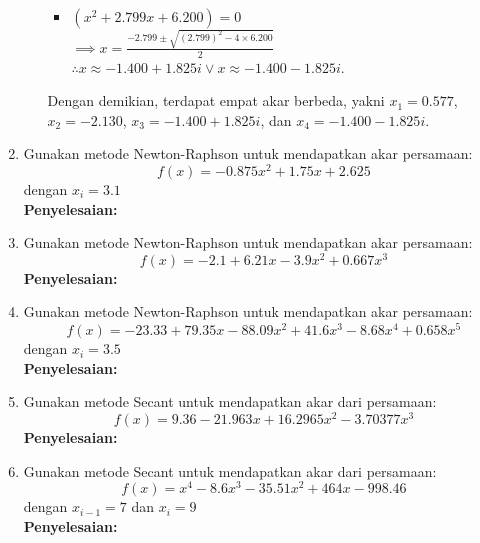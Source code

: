 \documentclass{article}
\newcommand{\penyelesaian}{\textbf{Penyelesaian: }}
\begin{document}
\begin{enumerate}
\begin{enumerate}
\begin{itemize}
            \item $(x^2 + \num{2,799}x + \num{6,200}) = 0$ \\
            $ \implies x = \frac{-\num{2,799} \pm \sqrt{(\num{2,799})^2 - 4 \times \num{6,200}}}{2}$ \\
            $ \therefore x \approx \num{-1,400} + \num{1,825}i \vee x \approx \num{-1,400} - \num{1,825}i$.
        \end{itemize} 
        
        Dengan demikian, terdapat empat akar berbeda, yakni $x_1 = \num{0,577}$, $x_2 = \num{-2,130}$, $x_3 = \num{-1,400} + \num{1,825}i$, dan $x_4 = \num{-1,400} - \num{1,825}i$.
    \end{enumerate}

    \item Gunakan metode Newton-Raphson untuk mendapatkan akar persamaan: \\
    \begin{equation*}
        f(x) = -\num{0,875}x^2 + \num{1,75}x + \num{2,625}
    \end{equation*}
    dengan $x_i = \num{3,1}$ \\
    \penyelesaian

    \item Gunakan metode Newton-Raphson untuk mendapatkan akar persamaan: \\
    \begin{equation*}
        f(x) = -\num{2,1} + \num{6,21}x - \num{3,9}x^2 + \num{0,667}x^3
    \end{equation*}
    \penyelesaian

    \item Gunakan metode Newton-Raphson untuk mendapatkan akar persamaan: \\
    \begin{equation*}
        f(x) = -\num{23,33} + \num{79,35}x - \num{88,09}x^2 + \num{41,6}x^3 - \num{8,68}x^4 + \num{0,658}x^5
    \end{equation*}
    dengan $x_i = \num{3,5}$ \\
    \penyelesaian

    \item Gunakan metode Secant untuk mendapatkan akar dari persamaan:
    \begin{equation*}
        f(x) = \num{9,36} - \num{21,963}x + \num{16,2965}x^2 - \num{3,70377}x^3
    \end{equation*}
    \penyelesaian

    \item Gunakan metode Secant untuk mendapatkan akar dari persamaan:
    \begin{equation*}
        f(x) = x^4 - \num{8,6}x^3 - \num{35,51}x^2 + \num{464}x - \num{998,46}
    \end{equation*}
    dengan $x_{i-1} = \num{7}$ dan $x_i = \num{9}$ \\
    \penyelesaian


\end{enumerate}
\end{document}
